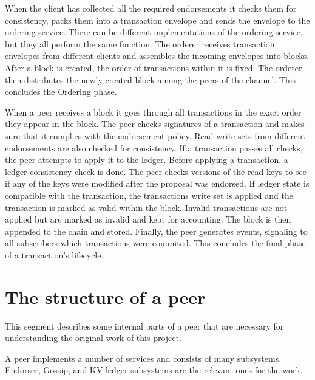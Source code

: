 When the client has collected all the required endorsements it checks them for consistency, packs them into a transaction envelope and sends the envelope to the ordering service. There can be different implementations of the ordering service, but they all perform the same function. The orderer receives transaction envelopes from different clients and assembles the incoming envelopes into blocks. After a  block is created, the order of transactions within it is fixed. The orderer then distributes the newly created block among the peers of the channel. This concludes the Ordering phase.

When a peer receives a block it goes through all transactions in the exact order they appear in the block. The peer checks signatures of a transaction and makes sure that it complies with the endorsement policy. Read-write sets from different endorsements are also checked for consistency. If a transaction passes all checks, the peer attempts to apply it to the ledger. Before applying a transaction, a ledger consistency check is done. The peer checks versions of the read keys to see if any of the keys were modified after the proposal was endorsed. If ledger state is compatible with the transaction, the transactions write set is applied and the transaction is marked as valid within the block. Invalid transactions are not applied but are marked as invalid and kept for accounting. The block is then appended to the chain and stored. Finally, the peer generates events, signaling to all subscribers which transactions were commited. This concludes the final phase of a transaction's lifecycle.

\section{The structure of a peer}

This segment describes some internal parts of a peer that are necessary for understanding the original work of this project.

A peer implements a number of services and consists of many subsystems. Endorser, Gossip, and KV-ledger subsystems are the relevant ones for the work.

